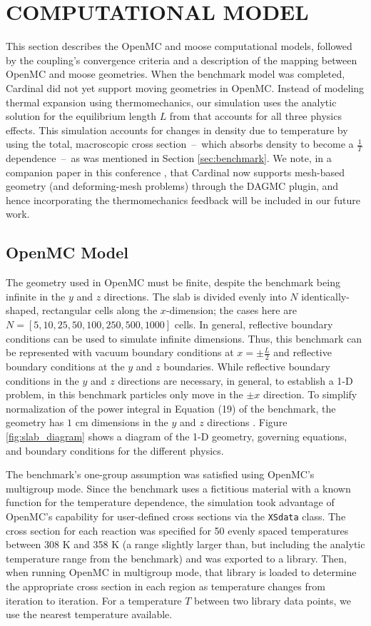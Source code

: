 \documentclass[letterpaper]{mc2023}
\begin{document}
\section{COMPUTATIONAL MODEL}\label{sec:model}
This section describes the OpenMC and \gls{moose} computational models, followed by the coupling's convergence criteria and
a description of the mapping between OpenMC and \gls{moose} geometries. When the benchmark model was completed, Cardinal did
not yet support moving geometries in OpenMC. Instead of modeling thermal expansion using thermomechanics, our simulation uses
the analytic solution for the equilibrium length $L$ from \cite{analytical-benchmark} that accounts for all three physics
effects. This simulation accounts for changes in density due to temperature by using the total, macroscopic cross section\ --\
which absorbs density to become a $\frac{1}{T}$ dependence\ --\ as was mentioned in Section \ref{sec:benchmark}. We note, in
a companion paper in this conference \cite{novak-2023}, that Cardinal now supports mesh-based geometry (and deforming-mesh
problems) through the DAGMC plugin, and hence incorporating the thermomechanics feedback will be included in our future work.

\subsection{OpenMC Model}
\label{sec:model:OpenMC}
The geometry used in OpenMC must be finite, despite the benchmark being infinite in the $y$ and $z$ directions. The slab is
divided evenly into $N$ identically-shaped, rectangular cells along the $x$-dimension; the cases here are $N=[5,10,25,50,100,
250,500,1000]$ cells. In general, reflective boundary conditions can be used to simulate infinite dimensions. Thus, this
benchmark can be represented with vacuum boundary conditions at $x=\pm \frac{L}{2}$ and reflective boundary conditions at
the $y$ and $z$ boundaries. While reflective boundary conditions in the $y$ and $z$ directions are necessary, in general, to
establish a 1-D problem, in this benchmark particles only move in the $\pm x$ direction. To simplify normalization of the power
integral in Equation (19) of the benchmark, the geometry has $1$ cm dimensions in the $y$ and $z$ directions \cite{analytical-benchmark}.
Figure \ref{fig:slab_diagram} shows a diagram of the 1-D geometry, governing equations, and boundary conditions for the different physics.

The benchmark's one-group assumption was satisfied using OpenMC's multigroup mode. Since the benchmark uses a fictitious material
with a known function for the temperature dependence, the simulation took advantage of OpenMC's capability for user-defined
cross sections via the \texttt{XSdata} class. The cross section for each reaction was specified for 50 evenly spaced temperatures
between 308 K and 358 K (a range slightly larger than, but including the  analytic temperature range from the benchmark) and was
exported to a library. Then, when running OpenMC in multigroup mode, that library is loaded to determine the appropriate cross
section in each region as temperature changes from iteration to iteration. For a temperature $T$ between two library data points,
we use the nearest temperature available.
\end{document}
